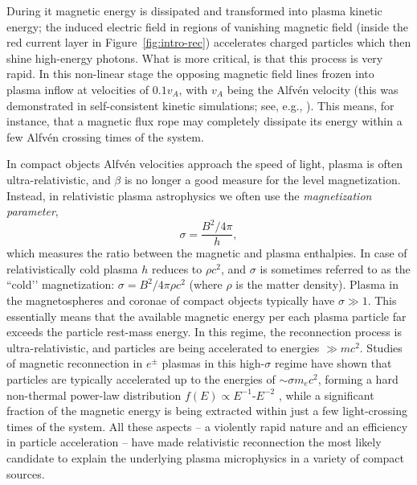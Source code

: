 During it magnetic energy is dissipated and transformed into plasma kinetic energy; the induced electric field in regions of vanishing magnetic field (inside the red current layer in Figure~\ref{fig:intro-rec}) accelerates charged particles which then shine high-energy photons. What is more critical, is that this process is very rapid. In this non-linear stage the opposing magnetic field lines frozen into plasma inflow at velocities of $0.1 v_A$, with $v_A$ being the Alfv\'en velocity (this was demonstrated in self-consistent kinetic simulations; see, e.g., \citealt{2008ApJ...684.1477Z,2012ApJ...750..129B,2014A&A...570A.111M}). This means, for instance, that a magnetic flux rope may completely dissipate its energy within a few Alfv\'en crossing times of the system. 

In compact objects Alfv\'en velocities approach the speed of light, plasma is often ultra-relativistic, and $\beta$ is no longer a good measure for the level magnetization. Instead, in relativistic plasma astrophysics we often use the \emph{magnetization parameter},
\begin{equation*}
\sigma = \frac{B^2/4\pi}{h},
\end{equation*}
which measures the ratio between the magnetic and plasma enthalpies. In case of relativistically cold plasma $h$ reduces to $\rho c^2$, and $\sigma$ is sometimes referred to as the ``cold’’ magnetization: $\sigma = B^2 / 4\pi \rho c^2$ (where $\rho$ is the matter density). Plasma in the magnetospheres and coronae of compact objects typically have $\sigma\gg1$. This essentially means that the available magnetic energy per each plasma particle far exceeds the particle rest-mass energy. In this regime, the reconnection process is ultra-relativistic, and particles are being accelerated to energies $\gg m c^2$. Studies of magnetic reconnection in $e^\pm$ plasmas in this high-$\sigma$ regime have shown that particles are typically accelerated up to the energies of $\sim \sigma m_e c^2$, forming a hard non-thermal power-law distribution $f(E)\propto E^{-1}\text{-}E^{-2}$ \citep[e.g.,][]{2014PhRvL.113o5005G, 2014ApJ...783L..21S,  2016ApJ...816L...8W}, while a significant fraction of the magnetic energy is being extracted within just a few light-crossing times of the system. All these aspects -- a violently rapid nature and an efficiency in particle acceleration -- have made relativistic reconnection the most likely candidate to explain the underlying plasma microphysics in a variety of compact sources.

